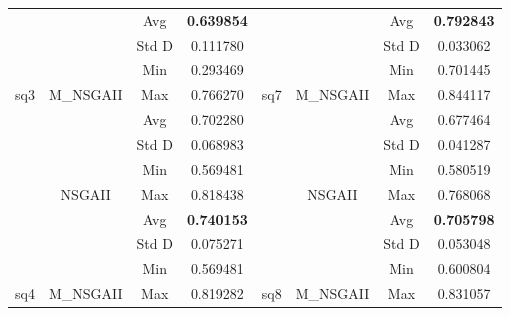\begin{table}[]
\begin{tabular}{cccccccc}
		&                             & Avg        & \textbf{0.639854} &                       &                                                     & Avg        & \textbf{0.792843} \\ \cline{3-4} \cline{7-8} 
		&                             & Std D      & 0.111780          &                       &                                                     & Std D      & 0.033062          \\ \cline{3-4} \cline{7-8} 
		&                             & Min        & 0.293469          &                       &                                                     & Min        & 0.701445          \\ \cline{3-4} \cline{7-8} 
		\multirow{-8}{*}{sq3} & \multirow{-4}{*}{M\_NSGAII} & Max        & 0.766270          & \multirow{-8}{*}{sq7} & \multirow{-4}{*}{M\_NSGAII}                         & Max        & 0.844117          \\ \hline
		&                             & Avg        & 0.702280          &                       &                                                     & Avg        & 0.677464          \\ \cline{3-4} \cline{7-8} 
		&                             & Std D      & 0.068983          &                       &                                                     & Std D      & 0.041287         \\ \cline{3-4} \cline{7-8} 
		&                             & Min        & 0.569481          &                       &                                                     & Min        & 0.580519          \\ \cline{3-4} \cline{7-8} 
		& \multirow{-4}{*}{NSGAII}    & Max        & 0.818438          &                       & \multirow{-4}{*}{NSGAII}                            & Max        & 0.768068          \\ \cline{2-4} \cline{6-8} 
		&                             & Avg        & \textbf{0.740153} &                       &                                                     & Avg        & \textbf{0.705798} \\ \cline{3-4} \cline{7-8} 
		&                             & Std D      & 0.075271          &                       &                                                     & Std D      & 0.053048          \\ \cline{3-4} \cline{7-8} 
		&                             & Min        & 0.569481          &                       &                                                     & Min        & 0.600804          \\ \cline{3-4} \cline{7-8} 
		\multirow{-8}{*}{sq4} & \multirow{-4}{*}{M\_NSGAII} & Max        & 0.819282          & \multirow{-8}{*}{sq8} & \multirow{-4}{*}{M\_NSGAII}                         & Max        & 0.831057          \\ \hline
	\end{tabular}
\end{table}


